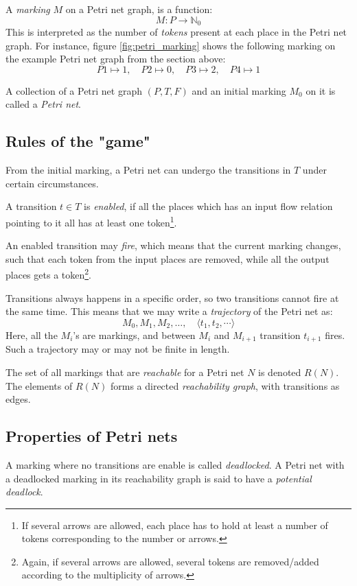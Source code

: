 \documentclass[12pt, a4paper]{article}
\numberwithin{equation}{section}
\begin{document}
A \textit{marking} $M$ on a Petri net graph, is a function:
\begin{equation}
M: P\rightarrow\mathbb{N}_0
\end{equation}
This is interpreted as the number of \textit{tokens} present at each place in the Petri net graph. For instance, figure \ref{fig:petri_marking} shows the following marking on the example Petri net graph from the section above:
\begin{equation}
P1\mapsto 1,\quad P2\mapsto 0,\quad P3\mapsto 2,\quad P4\mapsto 1
\end{equation}

A collection of a Petri net graph $(P, T, F)$ and an initial marking $M_0$ on it is called a \textit{Petri net}.

\subsection{Rules of the "game"}
From the initial marking, a Petri net can undergo the transitions in $T$ under certain circumstances.

A transition $t\in T$ is \textit{enabled}, if all the places which has an input flow relation pointing to it all has at least one token\footnote{If several arrows are allowed, each place has to hold at least a number of tokens corresponding to the number or arrows.}.

An enabled transition may \textit{fire}, which means that the current marking changes, such that each token from the input places are removed, while all the output places gets a token\footnote{Again, if several arrows are allowed, several tokens are removed/added according to the multiplicity of arrows.}.

Transitions always happens in a specific order, so two transitions cannot fire at the same time. This means that we may write a \textit{trajectory} of the Petri net as:
\begin{equation}
M_0, M_1, M_2, \ldots,\quad \langle t_1,t_2,\cdots\rangle
\end{equation}
Here, all the $M_i$'s are markings, and between $M_i$ and $M_{i+1}$ transition $t_{i+1}$ fires. Such a trajectory may or may not be finite in length.

The set of all markings that are \textit{reachable} for a Petri net $N$ is denoted $R(N)$. The elements of $R(N)$ forms a directed \textit{reachability graph}, with transitions as edges.

\subsection{Properties of Petri nets}
A marking where no transitions are enable is called \textit{deadlocked}. A Petri net with a deadlocked marking in its reachability graph is said to have a \textit{potential deadlock}.
\end{document}
